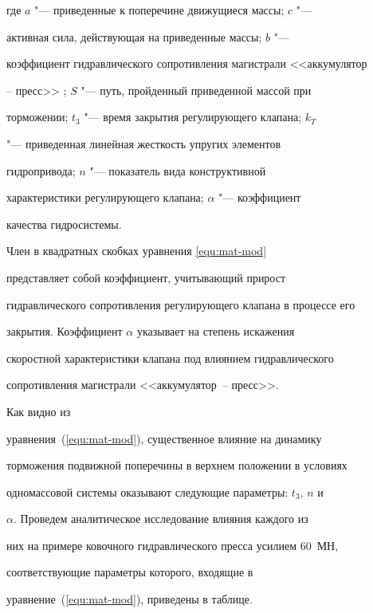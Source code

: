 где $a$ "--- приведенные к поперечине движущиеся массы; $c$ "---

активная сила, действующая на приведенные массы; $b$ "---

коэффициент гидравлического сопротивления магистрали <<аккумулятор

-- пресс>> ; $S$ "--- путь, пройденный приведенной массой при

торможении; $t_3$ "--- время закрытия регулирующего клапана; $k_T$

"--- приведенная линейная жесткость упругих элементов

гидропривода; $n$ "--- показатель вида конструктивной

характеристики регулирующего клапана; $\alpha$ "--- коэффициент

качества гидросистемы.



Член в квадратных скобках уравнения \eqref{equ:mat-mod}

представляет собой коэффициент, учитывающий прирост

гидравлического сопротивления регулирующего клапана в процессе его

закрытия. Коэффициент $\alpha$  указывает на степень искажения

скоростной характеристики клапана под влиянием гидравлического

сопротивления магистрали <<аккумулятор~-- пресс>>.



\smallskip



 Как видно из

уравнения~(\ref{equ:mat-mod}), существенное влияние на динамику

торможения подвижной поперечины в верхнем положении в условиях

одномассовой системы оказывают следующие параметры: $t_3$, $n$ и

$\alpha$. Проведем аналитическое исследование влияния каждого из

них на примере ковочного гидравлического пресса усилием $60$~МН,

соответствующие параметры которого, входящие в

уравнение~(\ref{equ:mat-mod}), приведены в таблице.



